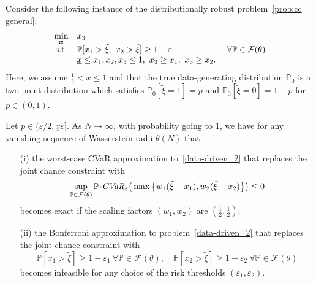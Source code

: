 \documentclass[nonblindrev]{informs2017}
\newcommand{\1}[1]{\mathds{1}{\left(#1\right)}}
\begin{document}
\begin{example}
	Consider the following instance of the distributionally robust problem~\eqref{prob:cc general}:
	\begin{equation}\label{data-driven_2}
	\begin{array}{cll}
	\displaystyle \min_{\bm{x}} & x_3 \\
	{\rm s.t.}&\mathbb{P}[x_1 > \tilde{\xi}, ~x_2 > \tilde{\xi}] \geq 1 - \varepsilon &~\forall \mathbb{P} \in \mathcal{F}(\theta) \\
	&\underline{x} \leq x_1,x_2,x_3 \leq 1, ~x_3 \geq x_1, ~x_3 \geq x_2.
	\end{array}
	\end{equation}
	Here, we assume $\frac{1}{2} < \underline{x} \leq 1$ and that the true data-generating distribution $\mathbb{P}_0$ is a two-point distribution which satisfies $\mathbb{P}_0[\tilde{\xi} = 1] = p$ and $\mathbb{P}_0[\tilde{\xi} = 0] = 1-p$ for $p \in (0,1)$.
\end{example}

\begin{proposition}\label{prop:CVaR better than bonferroni}
	Let $p \in (\varepsilon/2, \underline{x}\varepsilon]$. As $N \to \infty$, with probability going to $1$, we have for any vanishing sequence of Wasserstein radii $\theta(N)$ that
	\begin{enumerate}
		\item[(i)] the worst-case CVaR approximation to~\eqref{data-driven_2} that replaces the joint chance constraint with
		\begin{equation*}
			\sup_{\mathbb{P} \in \mathcal{F}(\theta)}\mathbb{P}\text{\emph{-CVaR}}_{\varepsilon}\big(\max\big\{w_1(\tilde{\xi} - x_1), w_2(\tilde{\xi} - x_2)\big\}\big) \leq 0
		\end{equation*}
		becomes exact if the scaling factors $(w_1, w_2)$ are $(\frac{1}{2}, \frac{1}{2})$; 
		\item[(ii)] the Bonferroni approximation to problem~\eqref{data-driven_2} that replaces the joint chance constraint with
		\begin{equation*}
			\mathbb{P} [x_1 > \tilde{\xi}] \geq 1-\varepsilon_1 ~\forall \mathbb{P} \in \mathcal{F}(\theta), \quad
			\mathbb{P} [x_2 > \tilde{\xi}] \geq 1-\varepsilon_2 ~\forall \mathbb{P} \in \mathcal{F}(\theta)
		\end{equation*}
		becomes infeasible for any choice of the risk thresholds $(\varepsilon_1, \varepsilon_2)$.
	\end{enumerate}	
\end{proposition}
\end{document}
